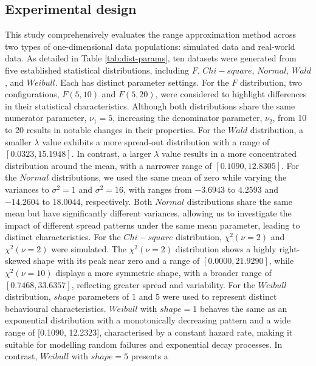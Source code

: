 \documentclass[a4paper,fleqn]{cas-dc}
\begin{document}
\subsection{Experimental design}
This study comprehensively evaluates the range approximation method across two types 
of one-dimensional data populations: simulated data and real-world data. As detailed in Table 
\ref{tab:dist-params}, 
ten datasets were generated from five established statistical distributions, including $F$, $Chi-square$, 
$Normal$, $Wald$, and $Weibull$. Each has distinct parameter settings. For the $F$ distribution, %
two configurations, $F(5, 10)$ and $F(5, 20)$, were considered to highlight  differences in their statistical 
characteristics. Although both distributions share the same numerator parameter, $\nu_1=5$, increasing the 
denominator parameter, $\nu_2$, from 10 to 20 results in notable changes in their properties. 
For the $Wald$ distribution, a smaller $\lambda$ value exhibits a more spread-out distribution 
with a range of $[0.0323, 15.1948]$. In contrast, a larger $\lambda$ value results in a more concentrated distribution around the mean, with a narrower range of $[0.1090, 12.8305]$.
For the $Normal$ distributions, we used the same mean of zero while varying the variances to 
$\sigma^2 = 1$ and $\sigma^2 = 16$, with ranges 
from $-3.6943$ to $4.2593$ and $-14.2604$ to $18.0044$, respectively. Both $Normal$ distributions share 
the same mean but have significantly different variances, 
allowing us to investigate the impact of different spread patterns under the same mean parameter, leading to distinct characteristics. For the $Chi-square$ 
distribution, $\chi^2(\nu=2)$ and $\chi^2(\nu=2)$ were simulated. The $\chi^2(\nu=2)$ distribution 
shows a highly right-skewed shape with its peak near zero and a range of $[0.0000, 21.9290]$, while $
\chi^2(\nu=10)$ displays a more symmetric shape, with a broader range of $[0.7468, 33.6357]$, reflecting greater spread and variability.
For the $Weibull$ distribution, $shape$ parameters of $1$ and $5$ were used to represent distinct behavioural characteristics.
$Weibull$ with $shape=1$ behaves 
the same as an exponential distribution with a monotonically decreasing pattern and a wide range of 
[0.1090, 12.2323], characterised by a constant hazard rate, making it suitable for modelling 
random failures and exponential decay processes. In contrast, $Weibull$ with $shape=5$ presents a 
\end{document}
